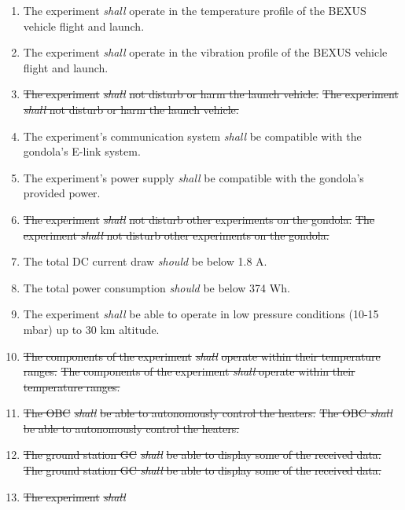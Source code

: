 \documentclass[a4paper,12pt,twoside]{article}
\providecommand{\DIFdeltex}[1]{{\protect\color{red}\sout{#1}}}                      %
\providecommand{\DIFaddbegin}{} %
\providecommand{\DIFaddend}{} %
\providecommand{\DIFdelbegin}{} %
\providecommand{\DIFdelend}{} %
\providecommand{\DIFdel}[1]{\texorpdfstring{\DIFdeltex{#1}}{}} %
\newcommand{\DIFscaledelfig}{0.5}
\newlength{\DIFdelgraphicswidth} %
\newlength{\DIFdelgraphicsheight} %
\newcommand{\DIFaddincludegraphics}[2][]{{\color{blue}\fbox{\DIFOincludegraphics[#1]{#2}}}} %
\newcommand{\DIFdelincludegraphics}[2][]{%
\sbox{\DIFdelgraphicsbox}{\DIFOincludegraphics[#1]{#2}}%
\settoboxwidth{\DIFdelgraphicswidth}{\DIFdelgraphicsbox} %
\settoboxtotalheight{\DIFdelgraphicsheight}{\DIFdelgraphicsbox} %
\scalebox{\DIFscaledelfig}{%
\parbox[b]{\DIFdelgraphicswidth}{\usebox{\DIFdelgraphicsbox}\\[-\baselineskip] \rule{\DIFdelgraphicswidth}{0em}}\llap{\resizebox{\DIFdelgraphicswidth}{\DIFdelgraphicsheight}{%
\setlength{\unitlength}{\DIFdelgraphicswidth}%
\begin{picture}(1,1)%
\thicklines\linethickness{2pt} %
{\color[rgb]{1,0,0}\put(0,0){\framebox(1,1){}}}%
{\color[rgb]{1,0,0}\put(0,0){\line( 1,1){1}}}%
{\color[rgb]{1,0,0}\put(0,1){\line(1,-1){1}}}%
\end{picture}%
}\hspace*{3pt}}} %
} %
\DeclareRobustCommand{\DIFaddbegin}{\DIFOaddbegin \let\includegraphics\DIFaddincludegraphics} %
\DeclareRobustCommand{\DIFaddend}{\DIFOaddend \let\includegraphics\DIFOincludegraphics} %
\DeclareRobustCommand{\DIFdelbegin}{\DIFOdelbegin \let\includegraphics\DIFdelincludegraphics} %
\DeclareRobustCommand{\DIFdelend}{\DIFOaddend \let\includegraphics\DIFOincludegraphics} %
\begin{document}
\begin{enumerate}[label=D.\arabic*]
    \item The experiment \textit{shall} operate in the temperature profile of the BEXUS vehicle flight and launch.
    \item The experiment \textit{shall} operate in the vibration profile of the BEXUS vehicle flight and launch.
    \item \DIFdelbegin \DIFdel{The experiment }\textit{\DIFdel{shall}} %
\DIFdel{not disturb or harm the launch vehicle.
    }\DIFdelend \DIFaddbegin \st{The experiment \textit{shall} not disturb or harm the launch vehicle.}
    \DIFaddend \item The experiment's communication system \textit{shall} be compatible with the gondola's E-link system.
    \item The experiment's power supply \textit{shall} be compatible with the gondola's provided power.
    \item \DIFdelbegin \DIFdel{The experiment }\textit{\DIFdel{shall}} %
\DIFdel{not disturb other experiments on the gondola.
    }\DIFdelend \DIFaddbegin \st{The experiment \textit{shall} not disturb other experiments on the gondola.}
    \DIFaddend \item The total DC current draw \textit{should} be below 1.8 A.
    \item The total power consumption \textit{should} be below 374 Wh.
    \item The experiment \textit{shall} be able to operate in low pressure conditions (10-15 mbar) up to 30 km altitude.
    \item \DIFdelbegin \DIFdel{The components of the experiment }\textit{\DIFdel{shall}} %
\DIFdel{operate within their temperature ranges.
    }\DIFdelend \DIFaddbegin \st{The components of the experiment \textit{shall} operate within their temperature ranges.}
    \DIFaddend \item \DIFdelbegin \DIFdel{The OBC }\textit{\DIFdel{shall}} %
\DIFdel{be able to autonomously control the heaters.
    }\DIFdelend \DIFaddbegin \st{The OBC \textit{shall} be able to autonomously control the heaters.}
    \DIFaddend \item \DIFdelbegin \DIFdel{The ground station GC }\textit{\DIFdel{shall}} %
\DIFdel{be able to display some of the received data.
    }\DIFdelend \DIFaddbegin \st{The ground station GC \textit{shall} be able to display some of the received data.}
    \DIFaddend \item \DIFdelbegin \DIFdel{The experiment }\textit{\DIFdel{shall}} %

\end{enumerate}
\end{document}
